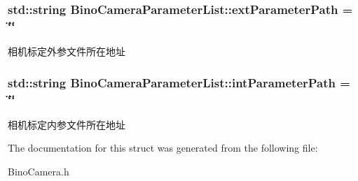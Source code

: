 \subsubsection[{\texorpdfstring{ext\+Parameter\+Path}{extParameterPath}}]{\setlength{\rightskip}{0pt plus 5cm}std\+::string Bino\+Camera\+Parameter\+List\+::ext\+Parameter\+Path = \char`\"{}\char`\"{}}\hypertarget{structBinoCameraParameterList_acc45b286726dc4f47ef631d905ddc8db}{}\label{structBinoCameraParameterList_acc45b286726dc4f47ef631d905ddc8db}
相机标定外参文件所在地址 
\subsubsection[{\texorpdfstring{int\+Parameter\+Path}{intParameterPath}}]{\setlength{\rightskip}{0pt plus 5cm}std\+::string Bino\+Camera\+Parameter\+List\+::int\+Parameter\+Path = \char`\"{}\char`\"{}}\hypertarget{structBinoCameraParameterList_ad2c8ebe70a244b212608d2a549c74b4a}{}\label{structBinoCameraParameterList_ad2c8ebe70a244b212608d2a549c74b4a}
相机标定内参文件所在地址 

The documentation for this struct was generated from the following file\+:\begin{DoxyCompactItemize}
\item 
Bino\+Camera.\+h\end{DoxyCompactItemize}
